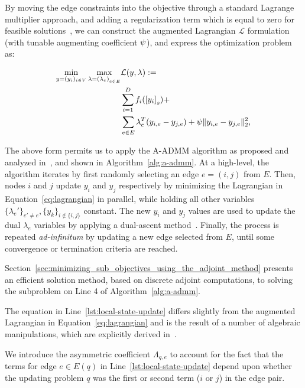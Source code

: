By moving the edge constraints into the objective through a standard Lagrange multiplier approach, and adding a regularization term which is equal to zero for feasible solutions~\cite{Boyd2010Distributed}, we can construct the augmented Lagrangian $\mathcal{L}$ formulation (with tunable augmenting coefficient $\psi$), and express the optimization problem as:

\begin{align}
	\label{eq:lagrangian}
	\min_{y = (y_i)_{i \in V}} \max_{\lambda = \left(\lambda_e\right)_{e \in E}} & \mathcal{L} \left(y,\lambda\right) :=  \\
	& \sum_{i = 1}^D f_i\left(\left[y_i\right]_{s}\right) + \\
	& \sum_{e\in E} \lambda_e^T \left(y_{i,e} - y_{j,e}\right) + \augterm \|y_{i,e} - y_{j,e}\|_2^2, \nonumber
\end{align}
	
The above form permits us to apply the A-ADMM algorithm as proposed and analyzed in~\cite{Wei2013On}, and shown in Algorithm~\ref{alg:a-admm}. At a high-level, the algorithm iterates by first randomly selecting an edge $e = \left(i,j\right)$ from $E$. Then, nodes $i$ and $j$ update $y_i$ and $y_j$ respectively by minimizing the Lagrangian in Equation~\eqref{eq:lagrangian} in parallel, while holding all other variables $\{\lambda_e'\}_{e' \neq e}, \{y_k\}_{i\notin \{i,j\}}$ constant. The new $y_i$ and $y_j$ values are used to update the dual $\lambda_e$ variables by applying a dual-ascent method~\cite{Boyd2010Distributed}. Finally, the process is repeated \emph{ad-infinitum} by updating a new edge selected from $E$, until some convergence or termination criteria are reached.

Section~\ref{sec:minimizing_sub_objectives_using_the_adjoint_method} presents an efficient solution method, based on discrete adjoint computations, to solving the subproblem on Line 4 of Algorithm~\ref{alg:a-admm}.

\begin{remark} The equation in Line~\ref{lst:local-state-update} differs slightly from the augmented Lagrangian in Equation~\eqref{eq:lagrangian} and is the result of a number of algebraic manipulations, which are explicitly derived in~\cite{Boyd2010Distributed,Wei2013On}.
\end{remark}
\begin{remark}
We introduce the asymmetric coefficient $\Lambda_{q,e}$ to account for the fact that the terms for edge $e\in E\left(q\right)$ in Line~\ref{lst:local-state-update} depend upon whether the updating problem $q$ was the first or second term ($i$ or $j$) in the edge pair.
\end{remark}

